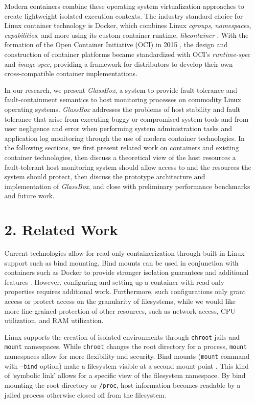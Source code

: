 \documentclass{proc}
\begin{document}
Modern containers combine these operating system virtualization approaches to create lightweight isolated execution contexts. The industry standard choice for Linux container technology is Docker, which combines Linux \textit{cgroups}, \textit{namespaces}, \textit{capabilities}, and more using its custom container runtime, \textit{libcontainer} \cite{hykes2014libcontainer}. With the formation of the Open Container Initiative (OCI) in 2015 \cite{opencontainerinitiative}, the design and construction of container platforms became standardized with OCI's \textit{runtime-spec} and \textit{image-spec}, providing a framework for distributors to develop their own cross-compatible container implementations.

In our research, we present \textit{GlassBox}, a system to provide fault-tolerance and fault-containment semantics to host monitoring processes on commodity Linux operating systems. \textit{GlassBox} addresses the problems of host stability and fault tolerance that arise from executing buggy or compromised system tools and from user negligence and error when performing system administration tasks and application log monitoring through the use of modern container technologies. In the following sections, we first present related work on containers and existing container technologies, then discuss a theoretical view of the host resources a fault-tolerant host monitoring system should allow access to and the resources the system should protect, then discuss the prototype architecture and implementation of \textit{GlassBox}, and close with preliminary performance benchmarks and future work.

\section*{2. Related Work}

Current technologies allow for read-only containerization through built-in Linux support such as bind mounting. Bind mounts can be used in conjunction with containers such as Docker to provide stronger isolation guarantees and additional features \cite{dockerdoc}. However, configuring and setting up a container with read-only properties requires additional work. Furthermore, such configurations only grant access or protect access on the granularity of filesystems, while we would like more fine-grained protection of other resources, such as network access, CPU utilization, and RAM utilization.

Linux supports the creation of isolated environments through \texttt{chroot} jails and \texttt{mount} namespaces. While \texttt{chroot} changes the root directory for a process, \texttt{mount} namespaces allow for more flexibility and security. Bind mounts (\texttt{mount} command with \texttt{--bind} option) make a filesystem visible at a second mount point \cite{bindmount}. This kind of `symbolic link' allows for a specific view of the filesystem namespace. By bind mounting the root directory or \texttt{/proc}, host information becomes readable by a jailed process otherwise closed off from the filesystem.
\end{document}

